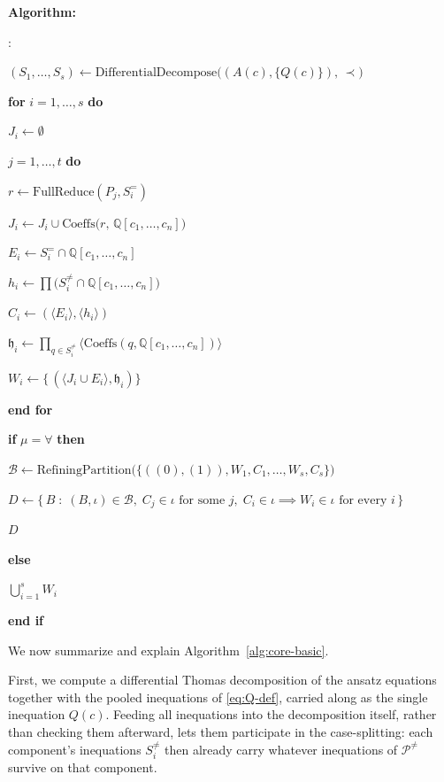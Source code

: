 \documentclass{article}
\theoremstyle{definition}
\theoremstyle{plain}
\newcounter{algline}
\newenvironment{pseudocode}
  {\begin{list}{\arabic{algline}:}%
     {\usecounter{algline}%
      \setlength{\leftmargin}{2.4em}\setlength{\labelwidth}{1.5em}%
      \setlength{\labelsep}{0.5em}\setlength{\itemsep}{1pt}%
      \setlength{\parsep}{0pt}\setlength{\topsep}{5pt}}}
  {\end{list}}
\newcommand{\algind}{\hspace*{1.3em}}
\begin{document}
\begin{algorithm}
{\bf Algorithm:}
\begin{pseudocode}
\item $(S_1, \ldots, S_s) \leftarrow \mathrm{DifferentialDecompose}\bigl( (A(c), \{Q(c)\}), \, \prec \bigr)$
\item {\bf for} $i = 1, \ldots, s$ {\bf do}
\item \algind $J_i \leftarrow \emptyset$
\item \algind {\bf for} $j = 1, \ldots, t$ {\bf do}
\item \algind\algind $r \leftarrow \mathrm{FullReduce}(P_j, S^=_i)$
\item \algind\algind $J_i \leftarrow J_i \cup \mathrm{Coeffs}\bigl(r, \, \mathbb{Q}[c_1, \ldots, c_n]\bigr)$
\item \algind {\bf end for}
\item \algind $E_i \leftarrow S^=_i \cap \mathbb{Q}[c_1, \ldots, c_n]$
\item \algind $h_i \leftarrow \prod \bigl( S^{\ne}_i \cap \mathbb{Q}[c_1, \ldots, c_n] \bigr)$
\item \algind $C_i \leftarrow (\langle E_i \rangle, \langle h_i \rangle)$
\item \algind $\mathfrak{h}_i \leftarrow \prod_{q \in S^{\ne}_i} \langle \mathrm{Coeffs}(q, \mathbb{Q}[c_1, \ldots, c_n]) \rangle$
\item \algind $W_i \leftarrow \bigl\{\, (\langle J_i \cup E_i \rangle, \mathfrak{h}_i) \bigr\}$
\item {\bf end for}
\item {\bf if} $\mu = \forall$ {\bf then}
\item \algind $\mathcal{B} \leftarrow \mathrm{RefiningPartition}\bigl( \{((0), (1)), W_1, C_1, \ldots, W_s, C_s\} \bigr)$
\item \algind $D \leftarrow \bigl\{\, B \;:\; (B, \iota) \in \mathcal{B}, \; C_j \in \iota \text{ for some } j, \; C_i \in \iota \implies W_i \in \iota \text{ for every } i \,\bigr\}$
\item \algind {\bf return} $D$
\item {\bf else}
\item \algind {\bf return} $\textstyle\bigcup_{i=1}^{s} W_i$
\item {\bf end if}
\end{pseudocode}
\end{algorithm}

We now summarize and explain Algorithm~\ref{alg:core-basic}.

First, we compute a differential Thomas decomposition of the ansatz equations together with the pooled
inequations of \eqref{eq:Q-def}, carried along as the single inequation
$Q(c)$.  Feeding all inequations into the decomposition itself, rather
than checking them afterward, lets them participate in the case-splitting: each
component's inequations $S^{\ne}_i$ then already carry whatever inequations of $\mathcal{P}^{\ne}$
survive on that component.
\end{document}
